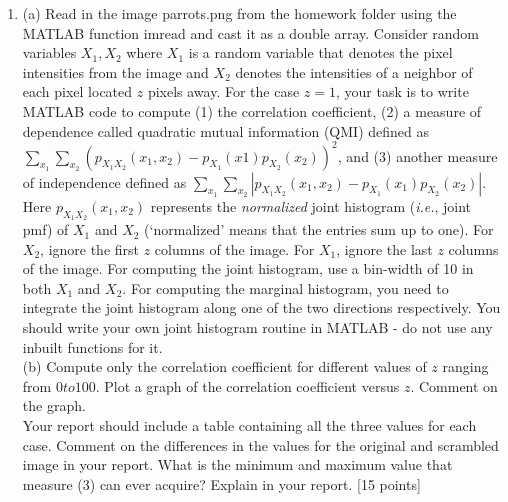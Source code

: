 \documentclass[11pt]{article}
\begin{document}
\begin{enumerate}
\item (a) Read in the image parrots.png from the homework folder using the MATLAB function imread and cast it as a double array. Consider random variables $X_1, X_2$ where $X_1$ is a random variable that denotes the pixel intensities from the image and $X_2$ denotes the intensities of a neighbor of each pixel located $z$ pixels away. For the case $z = 1$, your task is to write MATLAB code to compute (1) the correlation coefficient, (2) a measure of dependence called quadratic mutual information (QMI) defined as $\sum_{x_1}\sum_{x_2} (p_{X_1 X_2}(x_1,x_2)-p_{X_1}(x1)p_{X_2}(x_2))^2$, and (3) another measure of independence defined as $\sum_{x_1}\sum_{x_2} |p_{X_1 X_2}(x_1,x_2)-p_{X_1}(x_1)p_{X_2}(x_2)|$. Here $p_{X_1 X_2}(x_1,x_2)$ represents the \emph{normalized} joint histogram (\textit{i.e.}, joint pmf) of $X_1$ and $X_2$ (`normalized' means that the entries sum up to one). For $X_2$, ignore the first $z$ columns of the image. For $X_1$, ignore the last $z$ columns of the image. For computing the joint histogram, use a bin-width of 10 in both $X_1$ and $X_2$. For computing the marginal histogram, you need to integrate the joint histogram along one of the two directions respectively. You should write your own joint histogram routine in MATLAB - do not use any inbuilt functions for it. 
\\
(b) Compute only the correlation coefficient for different values of $z$ ranging from $0 to 100$. Plot a graph of the correlation coefficient versus $z$. Comment on the graph.
\\
Your report should include a table containing all the three values for each case. Comment on the differences in the values for the original and scrambled image in your report. What is the minimum and maximum value that measure (3) can ever acquire? Explain in your report. \textsf{[15 points]}

\end{enumerate}
\end{document}
